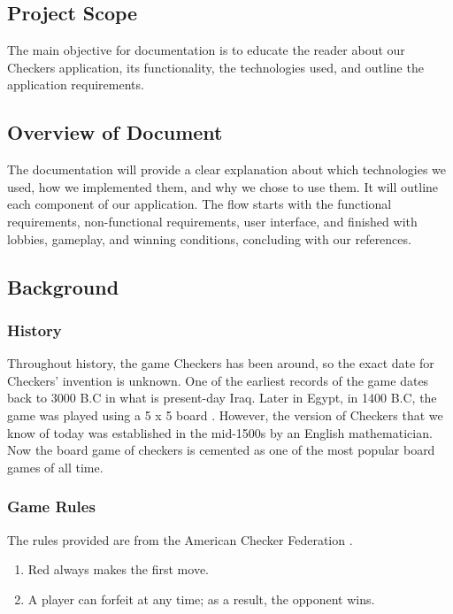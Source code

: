 \documentclass[10pt]{article}
\begin{document}
\subsection{Project Scope}
The main objective for documentation is to educate the reader about our Checkers application, 
its functionality, the technologies used, and outline the application requirements.

\subsection{Overview of Document}
The documentation will provide a clear explanation about which technologies we used, 
how we implemented them, and why we chose to use them. It will outline each component 
of our application. The flow starts with the functional requirements, non-functional requirements, 
user interface, and finished with lobbies, gameplay, and winning conditions, concluding with our references. 

\subsection{Background}

\subsubsection{History}

Throughout history, the game Checkers has been around, so the exact date for Checkers' 
invention is unknown. One of the earliest records of the game dates back to 3000 B.C in what 
is present-day Iraq. Later in Egypt, in 1400 B.C, the game was played using a 5 x 5 board \cite{historyCheckers}. 
However, the version of Checkers that we know of today was established in the mid-1500s by an English mathematician. 
Now the board game of checkers is cemented as one of the most popular board games of all time. 
\subsubsection{Game Rules}
    The rules provided are from the American Checker Federation \cite {checkersFoundation}.
    \begin{enumerate}
    \item Red always makes the first move.
    \item A player can forfeit at any time; as a result, the opponent wins.
    \end{enumerate}
\end{document}
